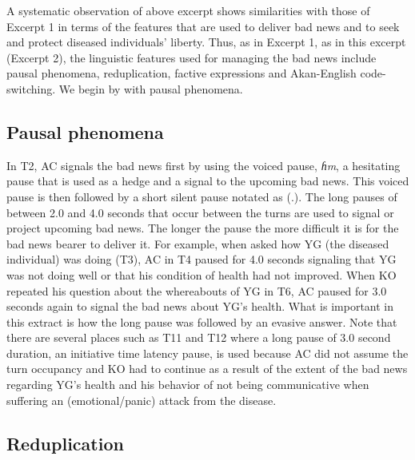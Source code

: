 \documentclass[output=paper,colorlinks,citecolor=brown]{langscibook}
\begin{document}
A systematic observation of above excerpt shows similarities with those of Excerpt 1 in terms of the features that are used to deliver bad news and to seek and protect diseased individuals’ liberty. Thus, as in Excerpt 1, as in this excerpt (Excerpt 2), the linguistic features used for managing the bad news include pausal phenomena, reduplication, factive expressions and Akan-English code-switching. We begin by with pausal phenomena. 

\subsection{Pausal phenomena}\label{sec:obeng:4.3}

In T2, AC signals the bad news first by using the voiced pause, \textit{ɦm}, a hesitating pause that is used as a hedge and a signal to the upcoming bad news. This voiced pause is then followed by a short silent pause notated as (.). The long pauses of between 2.0 and 4.0 seconds that occur between the turns are used to signal or project upcoming bad news. The longer the pause the more difficult it is for the bad news bearer to deliver it. For example, when asked how YG (the diseased individual) was doing (T3), AC in T4 paused for 4.0 seconds signaling that YG was not doing well or that his condition of health had not improved. When KO repeated his question about the whereabouts of YG in T6, AC paused for 3.0 seconds again to signal the bad news about YG’s health. What is important in this extract is how the long pause was followed by an evasive answer. Note that there are several places such as T11 and T12 where a long pause of 3.0 second duration, an initiative time latency pause, is used because AC did not assume the turn occupancy and KO had to continue as a result of the extent of the bad news regarding YG’s health and his behavior of not being communicative when suffering an (emotional/panic) attack from the disease.

\subsection{Reduplication}\label{sec:obeng:4.4}
\end{document}
